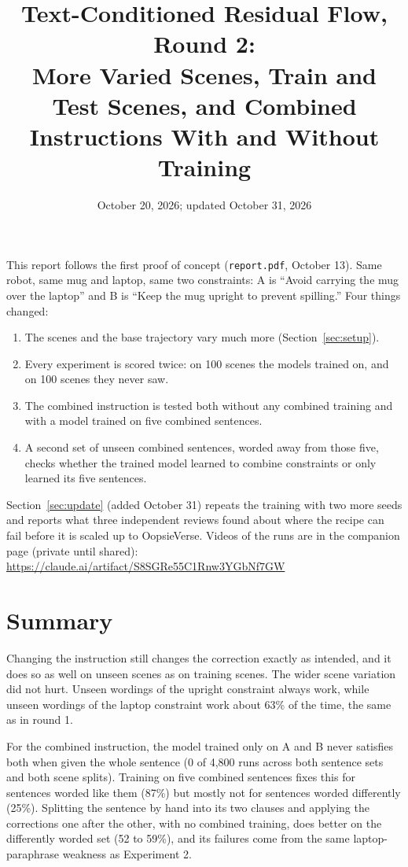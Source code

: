 \documentclass[11pt]{article}
\title{Text-Conditioned Residual Flow, Round 2:\\ More Varied Scenes, Train and Test Scenes, and Combined Instructions With and Without Training}
\date{October 20, 2026; updated October 31, 2026}
\author{}
\begin{document}
\maketitle

\noindent This report follows the first proof of concept (\texttt{report.pdf}, October 13). Same robot,
same mug and laptop, same two constraints: A is ``Avoid carrying the mug over the laptop'' and B is
``Keep the mug upright to prevent spilling.'' Four things changed:
\begin{enumerate}
  \item The scenes and the base trajectory vary much more (Section~\ref{sec:setup}).
  \item Every experiment is scored twice: on 100 scenes the models trained on, and on 100 scenes they never saw.
  \item The combined instruction is tested both without any combined training and with a model trained on
        five combined sentences.
  \item A second set of unseen combined sentences, worded away from those five, checks whether the
        trained model learned to combine constraints or only learned its five sentences.
\end{enumerate}
Section~\ref{sec:update} (added October 31) repeats the training with two more seeds and reports what
three independent reviews found about where the recipe can fail before it is scaled up to OopsieVerse.
Videos of the runs are in the companion page (private until shared):\\
\url{https://claude.ai/artifact/S8SGRe55C1Rnw3YGbNf7GW}

\section{Summary}

Changing the instruction still changes the correction exactly as intended, and it does so as well on
unseen scenes as on training scenes. The wider scene variation did not hurt. Unseen wordings of the
upright constraint always work, while unseen wordings of the laptop constraint work about 63\% of
the time, the same as in round 1.

For the combined instruction, the model trained only on A and B never satisfies both when given the
whole sentence (0 of 4{,}800 runs across both sentence sets and both scene splits). Training on five combined sentences fixes this
for sentences worded like them (87\%) but mostly not for sentences worded differently (25\%). Splitting
the sentence by hand into its two clauses and applying the corrections one after the other, with no
combined training, does better on the differently worded set (52 to 59\%), and its failures come from the same
laptop-paraphrase weakness as Experiment 2.
\end{document}
